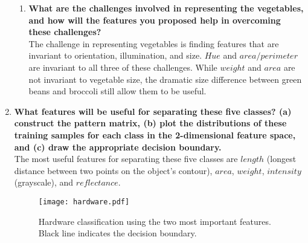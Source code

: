 \documentclass[12pt]{article}
\begin{document}
\begin{enumerate}
\begin{enumerate}
  \item \textbf{What are the challenges involved in representing the vegetables, and how will the features you proposed help in overcoming these challenges?} \\
    The challenge in representing vegetables is finding features that are invariant to orientation, illumination, and size. $Hue$ and $area/perimeter$ are invariant to all three of these challenges. While $weight$ and $area$ are not invariant to vegetable size, the dramatic size difference between green beans and broccoli still allow them to be useful.
  \end{enumerate}
\item \textbf{What features will be useful for separating these five classes?
  (a) construct the pattern matrix,
  (b) plot the distributions of these training samples for each class in the 2-dimensional feature space, and
  (c) draw the appropriate decision boundary.} \\
  The most useful features for separating these five classes are $length$ (longest distance between two points on the object's contour), $area$, $weight$, $intensity$ (grayscale), and $reflectance$.
  \begin{figure}[ht]
    \texttt{[image: hardware.pdf]}
    \caption{Hardware classification using the two most important features. Black line indicates the decision boundary.}
  \end{figure}
\end{enumerate}

 
 
\end{document}
